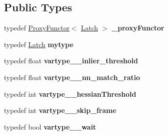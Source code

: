 \subsection*{Public Types}
\begin{DoxyCompactItemize}
\item 
\mbox{\label{classfilter_1_1algos_1_1_latch_ab01a349c554ecb7ae635ba2b4d50d009}} 
typedef \hyperlink{class_proxy_functor}{Proxy\+Functor}$<$ \hyperlink{classfilter_1_1algos_1_1_latch}{Latch} $>$ {\bfseries \+\_\+proxy\+Functor}
\item 
\mbox{\label{classfilter_1_1algos_1_1_latch_a525b7b5acf0c0c2aec645e7015112464}} 
typedef \hyperlink{classfilter_1_1algos_1_1_latch}{Latch} {\bfseries mytype}
\item 
\mbox{\label{classfilter_1_1algos_1_1_latch_a608a54613d0dbf192637fac2ac44cb2b}} 
typedef float {\bfseries vartype\+\_\+\+\_\+inlier\+\_\+threshold}
\item 
\mbox{\label{classfilter_1_1algos_1_1_latch_ad3567a1befaae0c27bd26914a588c135}} 
typedef float {\bfseries vartype\+\_\+\+\_\+nn\+\_\+match\+\_\+ratio}
\item 
\mbox{\label{classfilter_1_1algos_1_1_latch_a8a83f5d322a480c12087e096fa1332f9}} 
typedef int {\bfseries vartype\+\_\+\+\_\+hessian\+Threshold}
\item 
\mbox{\label{classfilter_1_1algos_1_1_latch_a613d6e056d09b6b0ef185054a02f1a43}} 
typedef int {\bfseries vartype\+\_\+\+\_\+skip\+\_\+frame}
\item 
\mbox{\label{classfilter_1_1algos_1_1_latch_a1b8824386807af7df3826d1671a88984}} 
typedef bool {\bfseries vartype\+\_\+\+\_\+wait}
\end{DoxyCompactItemize}
